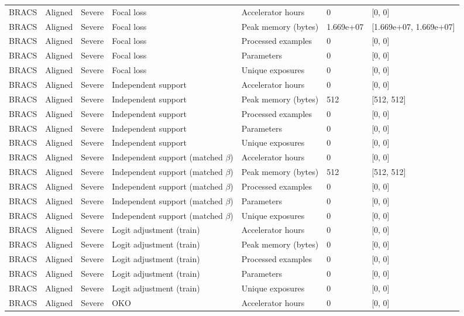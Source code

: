 \begin{longtable}{lllllll}
BRACS & Aligned & Severe & Focal loss & Accelerator hours & 0 & [0, 0] \\
BRACS & Aligned & Severe & Focal loss & Peak memory (bytes) & 1.669e+07 & [1.669e+07, 1.669e+07] \\
BRACS & Aligned & Severe & Focal loss & Processed examples & 0 & [0, 0] \\
BRACS & Aligned & Severe & Focal loss & Parameters & 0 & [0, 0] \\
BRACS & Aligned & Severe & Focal loss & Unique exposures & 0 & [0, 0] \\
BRACS & Aligned & Severe & Independent support & Accelerator hours & 0 & [0, 0] \\
BRACS & Aligned & Severe & Independent support & Peak memory (bytes) & 512 & [512, 512] \\
BRACS & Aligned & Severe & Independent support & Processed examples & 0 & [0, 0] \\
BRACS & Aligned & Severe & Independent support & Parameters & 0 & [0, 0] \\
BRACS & Aligned & Severe & Independent support & Unique exposures & 0 & [0, 0] \\
BRACS & Aligned & Severe & Independent support (matched $\beta$) & Accelerator hours & 0 & [0, 0] \\
BRACS & Aligned & Severe & Independent support (matched $\beta$) & Peak memory (bytes) & 512 & [512, 512] \\
BRACS & Aligned & Severe & Independent support (matched $\beta$) & Processed examples & 0 & [0, 0] \\
BRACS & Aligned & Severe & Independent support (matched $\beta$) & Parameters & 0 & [0, 0] \\
BRACS & Aligned & Severe & Independent support (matched $\beta$) & Unique exposures & 0 & [0, 0] \\
BRACS & Aligned & Severe & Logit adjustment (train) & Accelerator hours & 0 & [0, 0] \\
BRACS & Aligned & Severe & Logit adjustment (train) & Peak memory (bytes) & 0 & [0, 0] \\
BRACS & Aligned & Severe & Logit adjustment (train) & Processed examples & 0 & [0, 0] \\
BRACS & Aligned & Severe & Logit adjustment (train) & Parameters & 0 & [0, 0] \\
BRACS & Aligned & Severe & Logit adjustment (train) & Unique exposures & 0 & [0, 0] \\
BRACS & Aligned & Severe & OKO & Accelerator hours & 0 & [0, 0] \\

\end{longtable}
